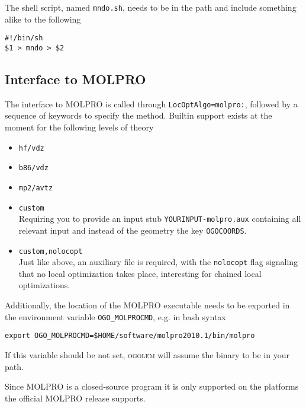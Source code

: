 \documentclass[a4paper,10pt]{scrbook}
\newcommand{\ogo}{\textsc{ogolem}}
\begin{document}
The shell script, named \texttt{mndo.sh}, needs to be in the path and include
something alike to the following
\begin{verbatim}
#!/bin/sh
$1 > mndo > $2
\end{verbatim}

\subsection{Interface to MOLPRO}
The interface to MOLPRO is called through \texttt{LocOptAlgo=molpro:}, followed
by a sequence of keywords to specify the method. Builtin support exists at the
moment for the following levels of theory
\begin{itemize}
  \item \texttt{hf/vdz}
  \item \texttt{b86/vdz}
  \item \texttt{mp2/avtz}
  \item \texttt{custom}\\
Requiring you to provide an input stub \texttt{YOURINPUT-molpro.aux} containing
all relevant input and instead of the geometry the key \texttt{OGOCOORDS}.
  \item \texttt{custom,nolocopt}\\
Just like above, an auxiliary file is required, with the \texttt{nolocopt} flag
signaling that no local optimization takes place, interesting for
chained local optimizations.
\end{itemize}

Additionally, the location of the MOLPRO executable needs to be exported in the
environment variable \texttt{OGO\_MOLPROCMD}, e.g. in bash syntax
\begin{verbatim}
export OGO_MOLPROCMD=$HOME/software/molpro2010.1/bin/molpro
\end{verbatim}
If this variable should be not set, \ogo{} will assume the binary to be in
your path.

Since MOLPRO is a closed-source program it is only supported on the platforms
the official MOLPRO release supports.
\end{document}
